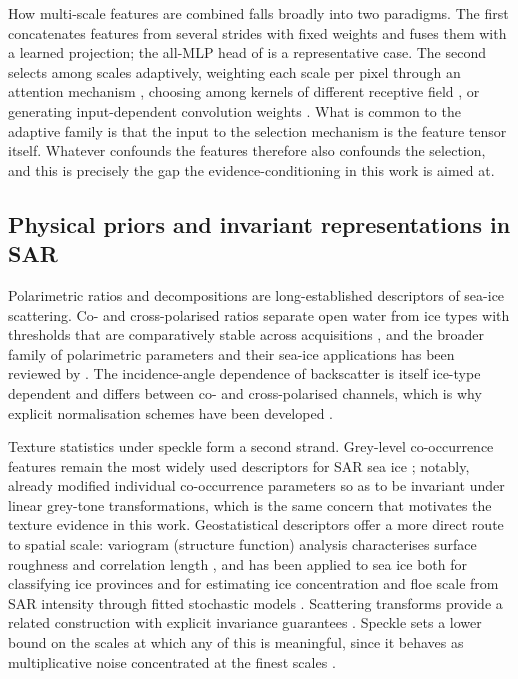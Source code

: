 \documentclass[preprint,12pt,authoryear]{elsarticle}
\begin{document}
How multi-scale features are combined falls broadly into two paradigms. The
first concatenates features from several strides with fixed weights and fuses
them with a learned projection; the all-MLP head of \citet{xie2021segformer} is
a representative case. The second selects among scales adaptively, weighting
each scale per pixel through an attention mechanism
\citep{chen2016attentiontoscale}, choosing among kernels of different receptive
field \citep{li2019sknet}, or generating input-dependent convolution weights
\citep{chen2020dynamicconv}. What is common to the adaptive family is that the
input to the selection mechanism is the feature tensor itself. Whatever
confounds the features therefore also confounds the selection, and this is
precisely the gap the evidence-conditioning in this work is aimed at.

\subsection{Physical priors and invariant representations in SAR}

Polarimetric ratios and decompositions are long-established descriptors of
sea-ice scattering. Co- and cross-polarised ratios separate open water from ice
types with thresholds that are comparatively stable across acquisitions
\citep{geldsetzer2009seaice}, and the broader family of polarimetric parameters
and their sea-ice applications has been reviewed by \citet{shokr2023polarimetric}.
The incidence-angle dependence of backscatter is itself ice-type dependent and
differs between co- and cross-polarised channels, which is why explicit
normalisation schemes have been developed \citep{aldenhoff2020incidence}.

Texture statistics under speckle form a second strand. Grey-level co-occurrence
features \citep{haralick1973textural} remain the most widely used descriptors for
SAR sea ice \citep{clausi2001comparison}; notably, \citet{shokr1991evaluation}
already modified individual co-occurrence parameters so as to be invariant under
linear grey-tone transformations, which is the same concern that motivates the
texture evidence in this work. Geostatistical descriptors offer a more direct
route to spatial scale: variogram (structure function) analysis characterises
surface roughness and correlation length \citep{garrigues2007variograms}, and has
been applied to sea ice both for classifying ice provinces
\citep{herzfeld2016geostatistical} and for estimating ice concentration and floe
scale from SAR intensity through fitted stochastic models
\citep{wang2016variograms}. Scattering transforms provide a related construction
with explicit invariance guarantees \citep{bruna2013scattering}. Speckle sets a
lower bound on the scales at which any of this is meaningful, since it behaves as
multiplicative noise concentrated at the finest scales
\citep{lee1981speckle,lee1981refined,argenti2013tutorial}.
\end{document}
